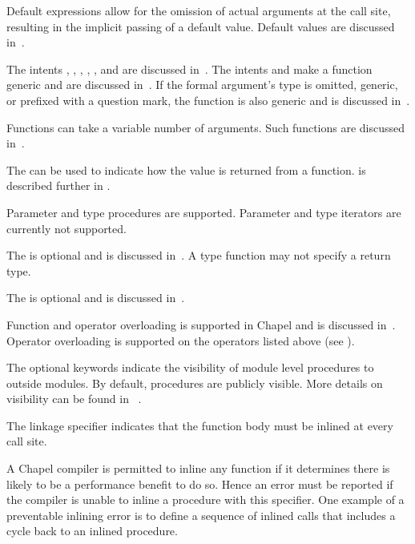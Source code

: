 Default expressions allow for the omission of actual arguments at the
call site, resulting in the implicit passing of a default value.
Default values are discussed in~.

The intents , , ,
, ,  and  are discussed
in~.  The intents  and  make a
function generic and are discussed in~.  If
the formal argument's type is omitted, generic, or prefixed with a
question mark, the function is also generic and is discussed
in~.

Functions can take a variable number of arguments.  Such functions are
discussed in~.

The  can be used to indicate how the value is returned from
a function.   is described further in .

\begin{openissue}
Parameter and type procedures are supported. Parameter and type
iterators are currently not supported.
\end{openissue}

The  is optional and is discussed in~.
A type function may not specify a return type.

The  is optional and is discussed
in~.

Function and operator overloading is supported in Chapel and is
discussed in~.
Operator overloading is supported on the operators listed
above (see ).

The optional  keywords indicate the visibility
of module level procedures to outside modules.  By default, procedures are
publicly visible.  More details on visibility can be found in
~.

The linkage specifier  indicates that the function body must
be inlined at every call site.

\begin{rationale}
A Chapel compiler is permitted to inline any function if it determines
there is likely to be a performance benefit to do so.  Hence an error
must be reported if the compiler is unable to inline a procedure with
this specifier.  One example of a preventable inlining error is to
define a sequence of inlined calls that includes a cycle back to an
inlined procedure.
\end{rationale}

